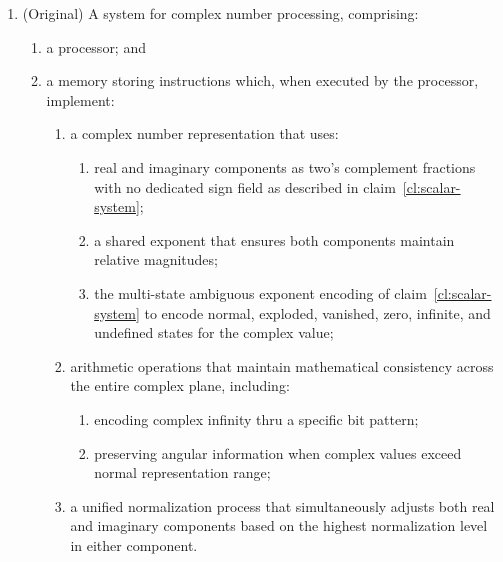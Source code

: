 \documentclass[12pt,letter]{article}
\begin{document}
\begin{enumerate}
          \item\label{cl:circle-system} (Original) A system for complex number processing, comprising:
          \begin{enumerate}
              \item a processor; and
              \item a memory storing instructions which, when executed by the processor, implement:
                    \begin{enumerate}
                        \item a complex number representation that uses:
                              \begin{enumerate}
                                  \item real and imaginary components as two's complement fractions with no dedicated sign field as described in claim~\ref{cl:scalar-system};
                                  \item a shared exponent that ensures both components maintain relative magnitudes;
                                  \item the multi-state ambiguous exponent encoding of claim~\ref{cl:scalar-system} to encode normal, exploded, vanished, zero, infinite, and undefined states for the complex value;
                              \end{enumerate}
                        \item arithmetic operations that maintain mathematical consistency across the entire complex plane, including:
                              \begin{enumerate}
                                  \item encoding complex infinity thru a specific bit pattern;
                                  \item preserving angular information when complex values exceed normal representation range;
                              \end{enumerate}
                        \item a unified normalization process that simultaneously adjusts both real and imaginary components based on the highest normalization level in either component.
                    \end{enumerate}
          \end{enumerate}


\end{enumerate}
\end{document}
